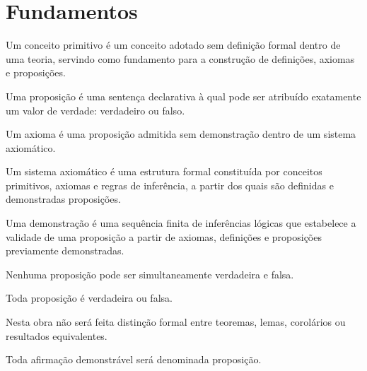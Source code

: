 \documentclass[../../main]{subfiles}
\begin{document}
\section{Fundamentos}
\label{sec:matematica:logica-matematica:fundamentos}

\begin{defn}
	\label{def:matematica:logica-matematica:fundamentos:conceito-primitivo}

	Um conceito primitivo é um conceito adotado sem definição formal dentro
	de uma teoria, servindo como fundamento para a construção de definições,
	axiomas e proposições.
\end{defn}

\begin{defn}[Proposição]
	\label{def:matematica:logica-matematica:fundamentos:proposicao}

	Uma proposição é uma sentença declarativa à qual pode ser atribuído
	exatamente um valor de verdade: verdadeiro ou falso.
\end{defn}

\begin{defn}[Axioma]
	\label{def:matematica:logica-matematica:fundamentos:axioma}

	Um axioma é uma proposição admitida sem demonstração dentro de um
	sistema axiomático.
\end{defn}

\begin{defn}
	\label{def:matematica:logica-matematica:fundamentos:sistema-axiomatico}

	Um sistema axiomático é uma estrutura formal constituída por conceitos
	primitivos, axiomas e regras de inferência, a partir dos quais são
	definidas e demonstradas proposições.
\end{defn}

\begin{defn}[Demonstração]
	\label{def:matematica:logica-matematica:fundamentos:demonstracao}

	Uma demonstração é uma sequência finita de inferências lógicas que
	estabelece a validade de uma proposição a partir de axiomas,
	definições e proposições previamente demonstradas.
\end{defn}

\begin{axiom}
	\label{axiom:matematica:logica-matematica:fundamentos:principio-nao-contradicao}

	Nenhuma proposição pode ser simultaneamente verdadeira e falsa.
\end{axiom}

\begin{axiom}
	\label{axiom:matematica:logica-matematica:fundamentos:principio-terceiro-excluido}

	Toda proposição é verdadeira ou falsa.
\end{axiom}

\begin{obs}
	Nesta obra não será feita distinção formal entre teoremas, lemas,
	corolários ou resultados equivalentes.

	Toda afirmação demonstrável será denominada proposição.
\end{obs}
\end{document}
